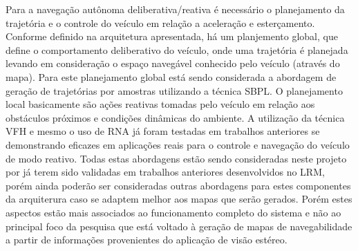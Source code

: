 \documentclass{article}
\begin{document}
Para a navegação autônoma deliberativa/reativa é necessário o planejamento da
trajetória e o controle do veículo em relação a aceleração e esterçamento.
Conforme definido na arquitetura apresentada, há um planjemento global, que
define o comportamento deliberativo do veículo, onde uma trajetória é planejada
levando em consideração o espaço navegável conhecido pelo veículo (através do
mapa). Para este planejamento global está sendo considerada a abordagem de
geração de trajetórias por amostras utilizando a técnica SBPL. O planejamento
local basicamente são ações reativas tomadas pelo veículo em relação aos
obstáculos próximos e condições dinâmicas do ambiente. A utilização da técnica
VFH e mesmo o uso de RNA já foram testadas em trabalhos anteriores se
demonstrando eficazes em aplicações reais para o controle e navegação do veículo
de modo reativo. Todas estas abordagens estão sendo consideradas neste projeto
por já terem sido validadas em trabalhos anteriores desenvolvidos no LRM, porém
ainda poderão ser consideradas outras abordagens para estes componentes da
arquiterura caso se adaptem melhor aos mapas que serão gerados. Porém estes
aspectos estão mais associados ao funcionamento completo do sistema e não ao
principal foco da pesquisa que está voltado à geração de mapas de navegabilidade
a partir de informações provenientes do aplicação de visão estéreo.
\end{document}
